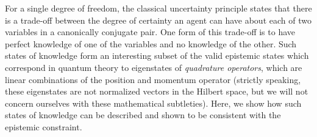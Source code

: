 \documentclass[pra,superscriptaddress,nofootinbib,12pt]{revtex4-2}
\begin{document}
For a single degree of freedom, the classical uncertainty principle states that there is a trade-off between the degree of certainty an agent can have about each of two variables in a canonically conjugate pair.  One form of this trade-off is to have perfect knowledge of one of the variables and no knowledge of the other.  Such states of knowledge form an interesting subset of the valid epistemic states which correspond in quantum theory to eigenstates of \emph{quadrature operators}, which are linear combinations of the position and momentum operator (strictly speaking, these eigenstates are not normalized vectors in the Hilbert space, but we will not concern ourselves with these mathematical subtleties).  Here, we show how such states of knowledge can be described and shown to be consistent with the epistemic constraint.
\end{document}
